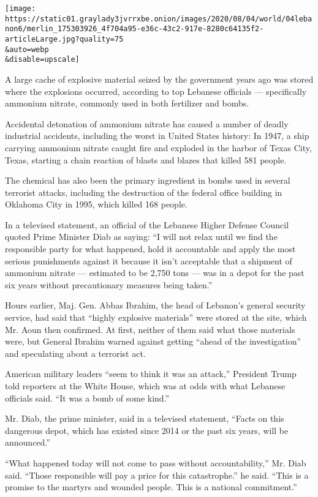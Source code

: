 \texttt{[image: https://static01.graylady3jvrrxbe.onion/images/2020/08/04/world/04lebanon6/merlin\_175303926\_4f704a95-e36c-43c2-917e-8280c64135f2-articleLarge.jpg?quality=75\\\&auto=webp\\\&disable=upscale]}

A large cache of explosive material seized by the government years ago
was stored where the explosions occurred, according to top Lebanese
officials --- specifically ammonium nitrate, commonly used in both
fertilizer and bombs.

Accidental detonation of ammonium nitrate has caused a number of deadly
industrial accidents, including the worst in United States history: In
1947, a ship carrying ammonium nitrate caught fire and exploded in the
harbor of Texas City, Texas, starting a chain reaction of blasts and
blazes that killed 581 people.

The chemical has also been the primary ingredient in bombs used in
several terrorist attacks, including the destruction of the federal
office building in Oklahoma City in 1995, which killed 168 people.

In a televised statement, an official of the Lebanese Higher Defense
Council quoted Prime Minister Diab as saying: ``I will not relax until
we find the responsible party for what happened, hold it accountable and
apply the most serious punishments against it because it isn't
acceptable that a shipment of ammonium nitrate --- estimated to be 2,750
tons --- was in a depot for the past six years without precautionary
measures being taken.''

Hours earlier, Maj. Gen. Abbas Ibrahim, the head of Lebanon's general
security service, had said that ``highly explosive materials'' were
stored at the site, which Mr. Aoun then confirmed. At first, neither of
them said what those materials were, but General Ibrahim warned against
getting ``ahead of the investigation'' and speculating about a terrorist
act.

American military leaders ``seem to think it was an attack,'' President
Trump told reporters at the White House, which was at odds with what
Lebanese officials said. ``It was a bomb of some kind.''

Mr. Diab, the prime minister, said in a televised statement, ``Facts on
this dangerous depot, which has existed since 2014 or the past six
years, will be announced.''

``What happened today will not come to pass without accountability,''
Mr. Diab said. ``Those responsible will pay a price for this
catastrophe.'' he said. ``This is a promise to the martyrs and wounded
people. This is a national commitment.''

